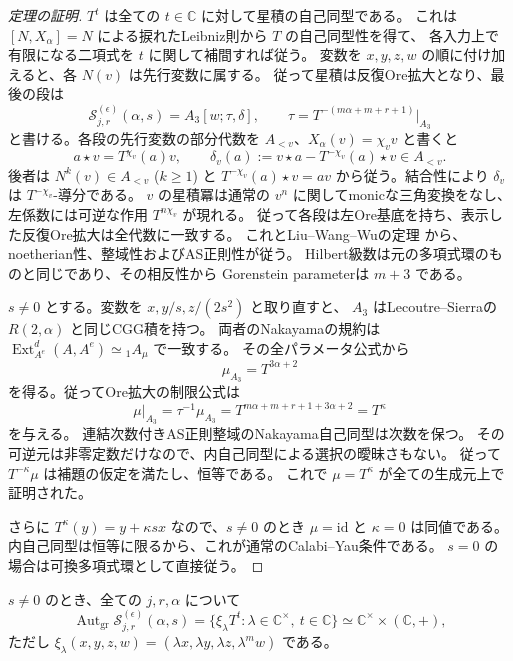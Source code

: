 \begin{proof}[定理の証明]
$T^t$ は全ての $t\in\mathbb C$ に対して星積の自己同型である。
これは $[N,X_\alpha]=N$ による捩れたLeibniz則から $T$ の自己同型性を得て、
各入力上で有限になる二項式を $t$ に関して補間すれば従う。
変数を $x,y,z,w$ の順に付け加えると、各 $N(v)$ は先行変数に属する。
従って星積は反復Ore拡大となり、最後の段は
\[
 \mathcal S_{j,r}^{(\epsilon)}(\alpha,s)
       =A_3[w;\tau,\delta],\qquad
 \tau=T^{-(m\alpha+m+r+1)}|_{A_3}
\]
と書ける。各段の先行変数の部分代数を $A_{<v}$、$X_\alpha(v)=\chi_vv$ と書くと
\[
 a\star v=T^{\chi_v}(a)v,\qquad
 \delta_v(a):=v\star a-T^{-\chi_v}(a)\star v\in A_{<v}.
\]
後者は $N^k(v)\in A_{<v}$ ($k\ge1$) と
$T^{-\chi_v}(a)\star v=av$ から従う。結合性により $\delta_v$ は
$T^{-\chi_v}$-導分である。
$v$ の星積冪は通常の $v^n$ に関してmonicな三角変換をなし、
左係数には可逆な作用 $T^{n\chi_v}$ が現れる。
従って各段は左Ore基底を持ち、表示した反復Ore拡大は全代数に一致する。
これとLiu--Wang--Wuの定理
\cite[Theorem 3.3 and Lemma 1.3]{LWW}から、
noetherian性、整域性およびAS正則性が従う。
Hilbert級数は元の多項式環のものと同じであり、その相反性から
Gorenstein parameterは $m+3$ である。

$s\ne0$ とする。変数を $x,y/s,z/(2s^2)$ と取り直すと、
$A_3$ はLecoutre--Sierraの $R(2,\alpha)$ と同じCGG積を持つ。
両者のNakayamaの規約は
$\operatorname{Ext}^d_{A^e}(A,A^e)\simeq {}_1A_\mu$ で一致する。
その全パラメータ公式\cite[Theorem 4.16]{LecoutreSierra2019}から
\[
 \mu_{A_3}=T^{3\alpha+2}
\]
を得る。従ってOre拡大の制限公式\cite[Theorem 3.3]{LWW}は
\[
 \mu|_{A_3}=\tau^{-1}\mu_{A_3}
       =T^{m\alpha+m+r+1+3\alpha+2}=T^\kappa
\]
を与える。
連結次数付きAS正則整域のNakayama自己同型は次数を保つ。
その可逆元は非零定数だけなので、内自己同型による選択の曖昧さもない。
従って $T^{-\kappa}\mu$ は補題の仮定を満たし、恒等である。
これで $\mu=T^\kappa$ が全ての生成元上で証明された。

さらに $T^\kappa(y)=y+\kappa sx$ なので、$s\ne0$ のとき
$\mu=\mathrm{id}$ と $\kappa=0$ は同値である。
内自己同型は恒等に限るから、これが通常のCalabi--Yau条件である。
$s=0$ の場合は可換多項式環として直接従う。
\end{proof}

\begin{corollary}[次数付き自己同型群]
\label{cor:affine-automorphisms-v34}
$s\ne0$ のとき、全ての $j,r,\alpha$ について
\[
 \operatorname{Aut}_{\mathrm{gr}}
     \mathcal S_{j,r}^{(\epsilon)}(\alpha,s)
       =\{\xi_\lambda T^t:\lambda\in\mathbb C^\times,
                                      \ t\in\mathbb C\}
       \simeq\mathbb C^\times\times(\mathbb C,+),
\]
ただし $\xi_\lambda(x,y,z,w)=(\lambda x,\lambda y,\lambda z,\lambda^m w)$
である。
\end{corollary}

